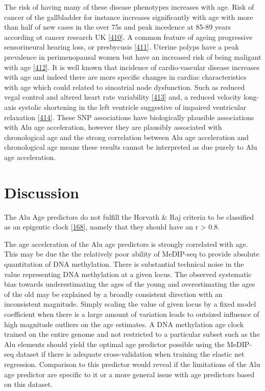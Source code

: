 \documentclass[
]{book}
\begin{document}
The risk of having many of these disease phenotypes increases with age.
Risk of cancer of the gallbladder for instance increases significantly with age with more than half of new cases in the over 75s and peak incedence at 85-89 years according ot cancer research UK {[}\protect\hyperlink{ref-CancerResearchUK2020}{410}{]}.
A common feature of ageing progressive sensorineural hearing loss, or presbycusis {[}\protect\hyperlink{ref-Lohler2019}{411}{]}.
Uterine polyps have a peak prevalence in perimenopausal women but have an increased risk of being maligant with age {[}\protect\hyperlink{ref-Hileeto2005}{412}{]}.
It is well known that incidence of cardio-vascular disease increases with age and indeed there are more specific changes in cardiac characteristics with age which could related to sinoatrial node dysfunction.
Such as reduced vegal control and altered heart rate variability {[}\protect\hyperlink{ref-Abhishekh2013}{413}{]} and, a reduced velocity long-axis systolic shortening in the left ventricle suggestive of impaired ventricular relaxation {[}\protect\hyperlink{ref-Nikitin2005}{414}{]}.
These SNP associations have biologically plausible associations with Alu age acceleration, however they are plausibly associated with chronological age and the strong correlation between Alu age acceleration and chronological age means these results cannot be interpreted as due purely to Alu age acceleration.

\newpage

\hypertarget{Alu-Discussion}{%
\section{Discussion}\label{Alu-Discussion}}

The Alu Age predictors do not fulfill the Horvath \& Raj criteria to be classified as an epigentic clock {[}\protect\hyperlink{ref-Horvath2018}{168}{]}, namely that they should have an r \textgreater{} 0.8.

The age acceleration of the Alu age predictors is strongly correlated with age.
This may be due the the relatively poor ability of MeDIP-seq to provide absolute quantitation of DNA methylation.
There is substantial technical noise in the value representing DNA methylation at a given locus.
The observed systematic bias towards underestimating the ages of the young and overestimating the ages of the old may be explained by a broadly consistent direction with an inconsistent magnitude.
Simply scaling the value of given locus by a fixed model coefficient when there is a large amount of variation leads to outsized influence of high magnitude outliers on the age estimates.
A DNA methylation age clock trained on the entire genome and not restricted to a particular subset such as the Alu elements should yield the optimal age predictor possible using the MeDIP-seq dataset if there is adequate cross-validation when training the elastic net regression.
Comparison to this predictor would reveal if the limitations of the Alu age predictor are specific to it or a more general issue with age predictors based on this dataset.
\end{document}
